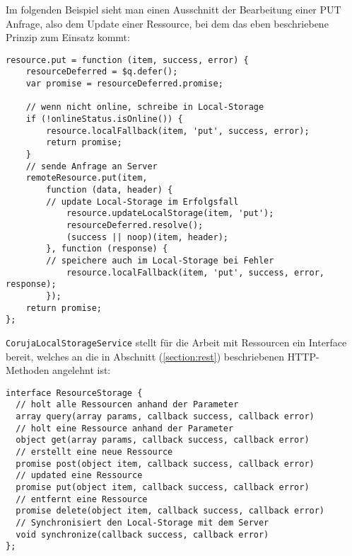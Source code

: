 Im folgenden Beispiel sieht man einen Ausschnitt der Bearbeitung einer PUT Anfrage, also dem Update einer Ressource, bei dem das eben beschriebene Prinzip zum Einsatz kommt:
\begin{lstlisting}
resource.put = function (item, success, error) {
    resourceDeferred = $q.defer();
    var promise = resourceDeferred.promise;

    // wenn nicht online, schreibe in Local-Storage
    if (!onlineStatus.isOnline()) {
        resource.localFallback(item, 'put', success, error);
        return promise;
    }
    // sende Anfrage an Server
    remoteResource.put(item,
        function (data, header) {
	    // update Local-Storage im Erfolgsfall
            resource.updateLocalStorage(item, 'put');
            resourceDeferred.resolve();
            (success || noop)(item, header);
        }, function (response) {
	    // speichere auch im Local-Storage bei Fehler
            resource.localFallback(item, 'put', success, error, response);
        });
    return promise;
}; 
\end{lstlisting}
\texttt{CorujaLocalStorageService} stellt für die Arbeit mit Ressourcen ein Interface bereit, welches an die in Abschnitt (\ref{section:rest}) beschriebenen \ac{HTTP}-Methoden angelehnt ist:
\begin{lstlisting}           
interface ResourceStorage {
  // holt alle Ressourcen anhand der Parameter
  array query(array params, callback success, callback error)
  // holt eine Ressource anhand der Parameter
  object get(array params, callback success, callback error)  
  // erstellt eine neue Ressource
  promise post(object item, callback success, callback error)
  // updated eine Ressource
  promise put(object item, callback success, callback error) 
  // entfernt eine Ressource
  promise delete(object item, callback success, callback error) 
  // Synchronisiert den Local-Storage mit dem Server
  void synchronize(callback success, callback error)
};             
\end{lstlisting}

